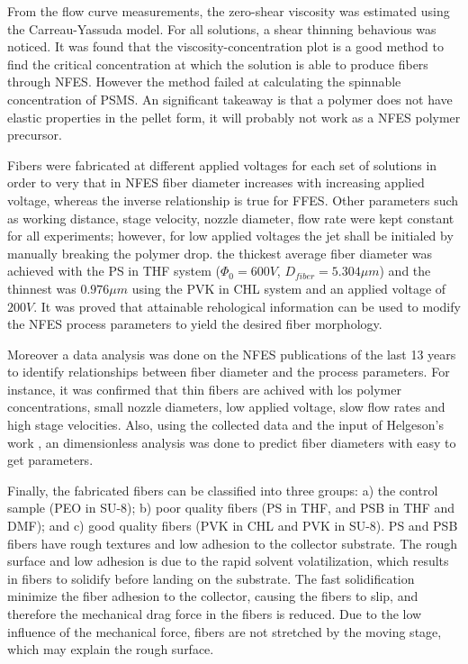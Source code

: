 From the flow curve measurements, the zero-shear viscosity was estimated using the Carreau-Yassuda model. For all solutions, a shear thinning behavious was noticed. It was found that the viscosity-concentration plot is a good method to find the critical concentration at which the solution is able to produce fibers through NFES. However the method failed at calculating the spinnable concentration of PSMS. An significant takeaway is that a polymer does not have elastic properties in the pellet form, it will probably not work as a NFES polymer precursor.

Fibers were fabricated at different applied voltages for each set of solutions in order to very that in NFES fiber diameter increases with increasing applied voltage, whereas the inverse relationship is true for FFES. Other parameters such as working distance, stage velocity, nozzle diameter, flow rate were kept constant for all experiments; however, for low applied voltages the jet shall be initialed by manually breaking the polymer drop. the thickest average fiber diameter was achieved with the PS in THF system ($\Phi_0 = 600 V$, $D_{fiber} = 5.304 \mu m$) and the thinnest was $0.976 \mu m$ using the PVK in CHL system and an applied voltage of $200 V$. It was proved that attainable rehological information can be used to modify the NFES process parameters to yield the desired fiber morphology.

Moreover a data analysis was done on the NFES publications of the last 13 years to identify relationships between fiber diameter and the process parameters. For instance, it was confirmed that thin fibers are achived with los polymer concentrations, small nozzle diameters, low applied voltage, slow flow rates and high stage velocities. Also, using the collected data and the input of Helgeson's work \cite{Helgeson2007}, an dimensionless analysis was done to predict fiber diameters with easy to get parameters.

Finally, the fabricated fibers can be classified into three groups: a) the control sample (PEO in SU-8); b) poor quality fibers (PS in THF, and PSB in THF and DMF); and c) good quality fibers (PVK in CHL and PVK in SU-8). PS and PSB fibers have rough textures and low adhesion to the collector substrate. The rough surface and low adhesion is due to the rapid solvent volatilization, which results in fibers to solidify before landing on the substrate. The fast solidification minimize the fiber adhesion to the collector, causing the fibers to slip, and therefore the mechanical drag force in the fibers is reduced. Due to the low influence of the mechanical force, fibers are not stretched by the moving stage, which may explain the rough surface.

